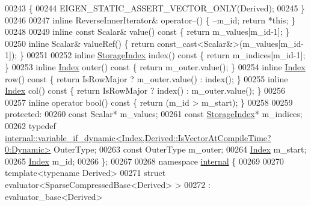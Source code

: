 \begin{DoxyCode}
00243     \{
00244       EIGEN\_STATIC\_ASSERT\_VECTOR\_ONLY(Derived);
00245     \}
00246 
00247     \textcolor{keyword}{inline} ReverseInnerIterator& operator--() \{ --m\_id; \textcolor{keywordflow}{return} *\textcolor{keyword}{this}; \}
00248 
00249     \textcolor{keyword}{inline} \textcolor{keyword}{const} Scalar& value()\textcolor{keyword}{ const }\{ \textcolor{keywordflow}{return} m\_values[m\_id-1]; \}
00250     \textcolor{keyword}{inline} Scalar& valueRef() \{ \textcolor{keywordflow}{return} \textcolor{keyword}{const\_cast<}Scalar&\textcolor{keyword}{>}(m\_values[m\_id-1]); \}
00251 
00252     \textcolor{keyword}{inline} \hyperlink{group___sparse_core___module_a0b540ba724726ebe953f8c0df06081ed}{StorageIndex} index()\textcolor{keyword}{ const }\{ \textcolor{keywordflow}{return} m\_indices[m\_id-1]; \}
00253     \textcolor{keyword}{inline} \hyperlink{group___core___module_a554f30542cc2316add4b1ea0a492ff02}{Index} outer()\textcolor{keyword}{ const }\{ \textcolor{keywordflow}{return} m\_outer.value(); \}
00254     \textcolor{keyword}{inline} \hyperlink{group___core___module_a554f30542cc2316add4b1ea0a492ff02}{Index} row()\textcolor{keyword}{ const }\{ \textcolor{keywordflow}{return} IsRowMajor ? m\_outer.value() : index(); \}
00255     \textcolor{keyword}{inline} \hyperlink{group___core___module_a554f30542cc2316add4b1ea0a492ff02}{Index} col()\textcolor{keyword}{ const }\{ \textcolor{keywordflow}{return} IsRowMajor ? index() : m\_outer.value(); \}
00256 
00257     \textcolor{keyword}{inline} \textcolor{keyword}{operator} bool()\textcolor{keyword}{ const }\{ \textcolor{keywordflow}{return} (m\_id > m\_start); \}
00258 
00259   \textcolor{keyword}{protected}:
00260     \textcolor{keyword}{const} Scalar* m\_values;
00261     \textcolor{keyword}{const} \hyperlink{group___sparse_core___module_a0b540ba724726ebe953f8c0df06081ed}{StorageIndex}* m\_indices;
00262     \textcolor{keyword}{typedef} 
      \hyperlink{class_eigen_1_1internal_1_1variable__if__dynamic}{internal::variable\_if\_dynamic<Index,Derived::IsVectorAtCompileTime?0:Dynamic>}
       OuterType;
00263     \textcolor{keyword}{const} OuterType m\_outer;
00264     \hyperlink{group___core___module_a554f30542cc2316add4b1ea0a492ff02}{Index} m\_start;
00265     \hyperlink{group___core___module_a554f30542cc2316add4b1ea0a492ff02}{Index} m\_id;
00266 \};
00267 
00268 \textcolor{keyword}{namespace }\hyperlink{namespaceinternal}{internal} \{
00269 
00270 \textcolor{keyword}{template}<\textcolor{keyword}{typename} Derived>
00271 \textcolor{keyword}{struct }evaluator<SparseCompressedBase<Derived> >
00272   : evaluator\_base<Derived>

\end{DoxyCode}
